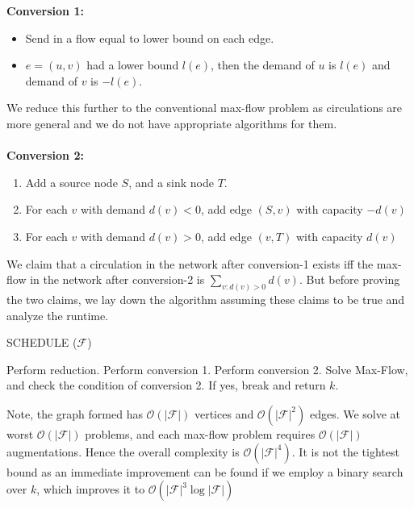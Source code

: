 \documentclass{article}
\newcommand{\bigOh}[1]{\mathcal{O}(#1)}
\begin{document}
        \textbf{Conversion 1:}
        \begin{itemize}
            \item Send in a flow equal to lower bound on each edge. 
            \item $e = (u, v)$ had a lower bound $l(e)$, then the demand of $u$ is $l(e)$ and demand of $v$ is $-l(e)$. 
        \end{itemize}
        We reduce this further to the conventional max-flow problem as circulations are more general and we do not have appropriate algorithms for them.\\\\
        \textbf{Conversion 2:}
        \begin{enumerate}
            \item Add a source node $S$, and a sink node $T$. 
            \item For each $v$ with demand $d(v) < 0$, add edge $(S, v)$ with capacity $-d(v)$
            \item For each $v$ with demand $d(v) > 0$, add edge $(v, T)$ with capacity $d(v)$
        \end{enumerate}
        We claim that a circulation in the network after conversion-1 exists iff the max-flow in the network after conversion-2 is $\sum_{v:d(v)>0} d(v)$. But before proving the two claims, we lay down the algorithm assuming these claims to be true and analyze the runtime. 
        \begin{algorithm}[H]
            \caption{SCHEDULE ($\mathcal{F}$)}
            \begin{algorithmic}[1]
                    \State Perform reduction. 
                    \State Perform conversion 1. 
                    \State Perform conversion 2. 
                    \State Solve Max-Flow, and check the condition of conversion 2. 
                    \State If yes, break and return $k$.
                \EndFor
            \end{algorithmic}
        \end{algorithm}
        Note, the graph formed has $\bigOh{|\mathcal{F}|}$ vertices and $\bigOh{|\mathcal{F}|^2}$ edges. We solve at worst  $\bigOh{|\mathcal{F}|}$ problems, and each max-flow problem requires  $\bigOh{|\mathcal{F}|}$ augmentations. Hence the overall complexity is $\bigOh{|\mathcal{F}|^4}$. It is not the tightest bound as an immediate improvement can be found if we employ a binary search over $k$, which improves it to $\bigOh{|\mathcal{F}|^3 \log |\mathcal{F}|}$\\\\
\end{document}
